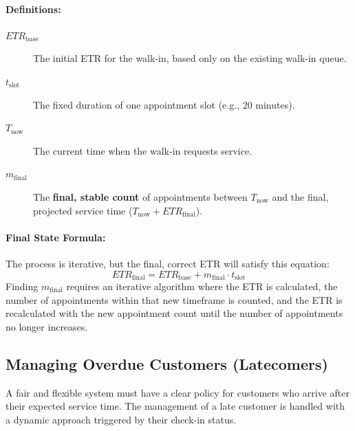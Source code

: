 \documentclass[12pt,a4paper]{report}
\begin{document}
\paragraph{Definitions:}
\begin{description}
    \item[$ETR_{\text{base}}$] The initial ETR for the walk-in, based only on the existing walk-in queue.
    \item[$t_{\text{slot}}$] The fixed duration of one appointment slot (e.g., 20 minutes).
    \item[$T_{\text{now}}$] The current time when the walk-in requests service.
    \item[$m_{\text{final}}$] The \textbf{final, stable count} of appointments between $T_{\text{now}}$ and the final, projected service time ($T_{\text{now}} + ETR_{\text{final}}$).
\end{description}

\paragraph{Final State Formula:}
The process is iterative, but the final, correct ETR will satisfy this equation:
\begin{equation}
    ETR_{\text{final}} = ETR_{\text{base}} + m_{\text{final}} \cdot t_{\text{slot}}
\end{equation}
Finding $m_{\text{final}}$ requires an iterative algorithm where the ETR is calculated, the number of appointments within that new timeframe is counted, and the ETR is recalculated with the new appointment count until the number of appointments no longer increases.

\subsection{Managing Overdue Customers (Latecomers)}
A fair and flexible system must have a clear policy for customers who arrive after their expected service time. The management of a late customer is handled with a dynamic approach triggered by their check-in status.
\end{document}
